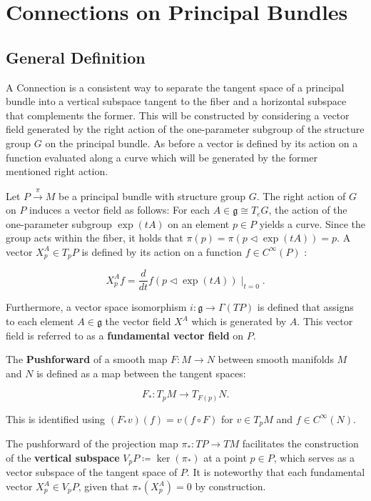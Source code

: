 
\chapter{Connections on Principal Bundles}

\section{General Definition}

A Connection is a consistent way to separate the tangent space of a principal bundle into a vertical subspace tangent to the fiber and a horizontal subspace that complements the former. This will be constructed by considering a vector field generated by the right action of the one-parameter subgroup of the structure group $G$ on the principal bundle. As before a vector is defined by its action on a function evaluated along a curve which will be generated by the former mentioned right action.

Let \( P \xrightarrow{\pi} M \) be a principal bundle with structure group \( G \). The right action of \( G \) on \( P \) induces a vector field as follows: For each \( A \in \mathfrak{g} \cong T_eG \), the action of the one-parameter subgroup \( \exp(tA) \) on an element \( p \in P \) yields a curve. Since the group acts within the fiber, it holds that \( \pi(p) = \pi(p \triangleleft \exp(tA)) = p \). A vector \( X^A_p \in T_pP \) is defined by its action on a function \( f \in C^\infty(P) \) \cite{NakaharaGeometrytopologyphysics2005}:

\[
X^A_p f = \frac{d}{dt} f(p \triangleleft \exp(tA))\mid_{t=0}.
\]

Furthermore, a vector space isomorphism \( i: \mathfrak{g} \longrightarrow \Gamma(TP) \) is defined that assigns to each element \( A \in \mathfrak{g} \) the vector field \( X^A \) which is generated by $A$. This vector field is referred to as a \textbf{fundamental vector field} on \( P \).

The \textbf{Pushforward} \cite{Pushforward2025} of a smooth map \( F:M \longrightarrow N \) between smooth manifolds \( M \) and \( N \) is defined as a map between the tangent spaces:

\[
F_* : T_pM \longrightarrow T_{F(p)}N.
\]

This is identified using \( (F_*v)(f) = v(f\circ F) \) for \( v \in T_pM \) and \( f \in C^\infty(N) \).

The pushforward of the projection map \( \pi_* : TP \longrightarrow TM \) facilitates the construction of the \textbf{vertical subspace} \( V_pP \coloneq \ker(\pi_*) \) at a point \( p \in P \), which serves as a vector subspace of the tangent space of \( P \).
It is noteworthy that each fundamental vector \( X^A_p \in V_pP \), given that \( \pi_* (X^A_p) = 0 \) by construction.

